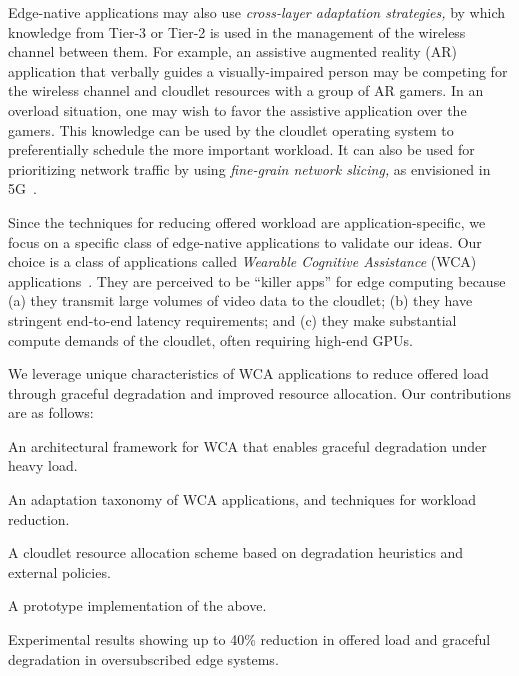 Edge-native applications may also use {\em cross-layer adaptation
  strategies,} by which knowledge from Tier-3 or Tier-2 is used in the
management of the wireless channel between them.  For example, an
assistive augmented reality (AR) application that verbally guides a
visually-impaired person may be competing for the wireless channel and
cloudlet resources with a group of AR gamers.  In an overload
situation, one may wish to favor the assistive application over the
gamers.  This knowledge can be used by the cloudlet operating system
to preferentially schedule the more important workload.  It can also
be used for prioritizing network traffic by using {\em fine-grain
  network slicing,} as envisioned in 5G~\cite{Contreras2018}.

Since the techniques for reducing offered workload are application-specific, we
focus on a specific class of edge-native applications to validate our ideas.
Our choice is a class of applications called {\em Wearable Cognitive Assistance}
(WCA) applications~\cite{Ha2014}.  They are perceived to be ``killer apps'' for
edge computing because (a) they transmit large volumes of video data to the
cloudlet; (b) they have stringent end-to-end latency requirements; and (c) they
make substantial compute demands of the cloudlet, often requiring high-end GPUs.

We leverage unique characteristics of WCA applications to reduce
offered load through graceful degradation and improved resource
allocation.  Our contributions are as follows:
\begin{smitemize}
  \item{An architectural framework for WCA that enables graceful degradation under heavy load.}
  \item{An adaptation taxonomy of WCA applications, and techniques for workload reduction.}
  \item{A cloudlet resource allocation scheme based on degradation heuristics and external policies.}
  \item{A prototype implementation of the above.}
  \item{Experimental results showing up to 40\% reduction in offered load and graceful degradation in oversubscribed edge systems.}
\end{smitemize}







